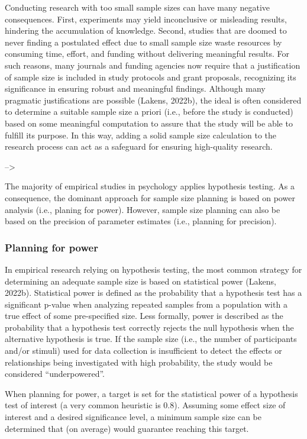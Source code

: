 \documentclass[
  man,floatsintext]{apa6}
\begin{document}
Conducting research with too small sample sizes can have many negative consequences.
First, experiments may yield inconclusive or misleading results, hindering the accumulation of knowledge.
Second, studies that are doomed to never finding a postulated effect due to small sample size waste resources by consuming time, effort, and funding without delivering meaningful results.
For such reasons, many journals and funding agencies now require that a justification of sample size is included in study protocols and grant proposals, recognizing its significance in ensuring robust and meaningful findings.
Although many pragmatic justifications are possible (Lakens, 2022b), the ideal is often considered to determine a suitable sample size a priori (i.e., before the study is conducted) based on some meaningful computation to assure that the study will be able to fulfill its purpose.
In this way, adding a solid sample size calculation to the research process can act as a safeguard for ensuring high-quality research.

--\textgreater{}

The majority of empirical studies in psychology applies hypothesis testing.
As a consequence, the dominant approach for sample size planning is based on power analysis (i.e., planing for power).
However, sample size planning can also be based on the precision of parameter estimates (i.e., planning for precision).

\hypertarget{planning-for-power}{%
\subsubsection{Planning for power}\label{planning-for-power}}

In empirical research relying on hypothesis testing, the most common strategy for determining an adequate sample size is based on statistical power (Lakens, 2022b).
Statistical power is defined as the probability that a hypothesis test has a significant p-value when analyzing repeated samples from a population with a true effect of some pre-specified size.
Less formally, power is described as the probability that a hypothesis test correctly rejects the null hypothesis when the alternative hypothesis is true.
If the sample size (i.e., the number of participants and/or stimuli) used for data collection is insufficient to detect the effects or relationships being investigated with high probability, the study would be considered ``underpowered''.

When planning for power, a target is set for the statistical power of a hypothesis test of interest (a very common heuristic is 0.8).
Assuming some effect size of interest and a desired significance level, a minimum sample size can be determined that (on average) would guarantee reaching this target.
\end{document}
